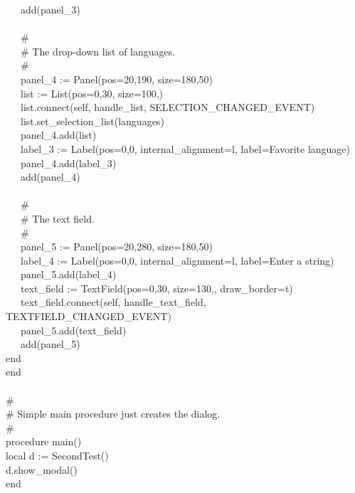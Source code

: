 {\>   \ \ \ add(panel\_3) \\
\ \\
\>   \ \ \ \# \\
\>   \ \ \ \# The drop-down list of languages. \\
\>   \ \ \ \# \\
\>   \ \ \ panel\_4 := Panel({\textquotedbl}pos=20,190{\textquotedbl},
{\textquotedbl}size=180,50{\textquotedbl}) \\
\>   \ \ \ list := List({\textquotedbl}pos=0,30{\textquotedbl},
{\textquotedbl}size=100,{\textquotedbl}) \\
\>   \ \ \ list.connect(self,
{\textquotedbl}handle\_list{\textquotedbl}, SELECTION\_CHANGED\_EVENT) \\
\>   \ \ \ list.set\_selection\_list(languages) \\
\>   \ \ \ panel\_4.add(list) \\
\>   \ \ \ label\_3 := Label({\textquotedbl}pos=0,0{\textquotedbl},
{\textquotedbl}internal\_alignment=l{\textquotedbl},
{\textquotedbl}label=Favorite language{\textquotedbl}) \\
\>   \ \ \ panel\_4.add(label\_3) \\
\>   \ \ \ add(panel\_4) \\
\ \\
\>   \ \ \ \# \\
\>   \ \ \ \# The text field. \\
\>   \ \ \ \# \\
\>   \ \ \ panel\_5 := Panel({\textquotedbl}pos=20,280{\textquotedbl},
{\textquotedbl}size=180,50{\textquotedbl}) \\
\>   \ \ \ label\_4 := Label({\textquotedbl}pos=0,0{\textquotedbl},
{\textquotedbl}internal\_alignment=l{\textquotedbl},
{\textquotedbl}label=Enter a string{\textquotedbl}) \\
\>   \ \ \ panel\_5.add(label\_4) \\
\>   \ \ \ text\_field :=
TextField({\textquotedbl}pos=0,30{\textquotedbl},
{\textquotedbl}size=130,{\textquotedbl},
{\textquotedbl}draw\_border=t{\textquotedbl}) \\
\>   \ \ \ text\_field.connect(self,
{\textquotedbl}handle\_text\_field{\textquotedbl},
TEXTFIELD\_CHANGED\_EVENT) \\
\>   \ \ \ panel\_5.add(text\_field) \\
\>   \ \ \ add(panel\_5) \\
\>   end \\
end \\
\ \\
\# \\
\# Simple main procedure just creates the dialog. \\
\# \\
procedure main() \\
\>   local d := SecondTest() \\
\>   d.show\_modal() \\
end
}

